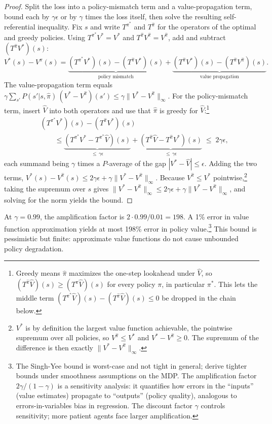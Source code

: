\begin{proof}
Split the loss into a policy-mismatch term and a value-propagation term, bound each by $\gamma\epsilon$ or by $\gamma$ times the loss itself, then solve the resulting self-referential inequality. Fix $s$ and write $T^{\pi^*}$ and $T^{\hat\pi}$ for the operators of the optimal and greedy policies. Using $T^{\pi^*} V^* = V^*$ and $T^{\hat\pi} V^{\hat\pi} = V^{\hat\pi}$, add and subtract $(T^{\hat\pi} V^*)(s)$:
\[
V^*(s) - V^{\hat\pi}(s) = \underbrace{(T^{\pi^*} V^*)(s) - (T^{\hat\pi} V^*)(s)}_{\text{policy mismatch}} + \underbrace{(T^{\hat\pi} V^*)(s) - (T^{\hat\pi} V^{\hat\pi})(s)}_{\text{value propagation}}.
\]
The value-propagation term equals $\gamma \sum_{s'} P(s'|s,\hat\pi)\,(V^* - V^{\hat\pi})(s') \leq \gamma \|V^* - V^{\hat\pi}\|_\infty$. For the policy-mismatch term, insert $\hat V$ into both operators and use that $\hat\pi$ is greedy for $\hat V$:\footnote{Greedy means $\hat\pi$ maximizes the one-step lookahead under $\hat V$, so $(T^{\hat\pi} \hat V)(s) \geq (T^{\pi} \hat V)(s)$ for every policy $\pi$, in particular $\pi^*$. This lets the middle term $(T^{\pi^*}\hat V)(s) - (T^{\hat\pi}\hat V)(s) \leq 0$ be dropped in the chain below.}
\begin{align*}
&(T^{\pi^*} V^*)(s) - (T^{\hat\pi} V^*)(s) \\
&\qquad \leq \underbrace{(T^{\pi^*} V^* - T^{\pi^*} \hat V)(s)}_{\leq\, \gamma\epsilon} + \underbrace{(T^{\hat\pi} \hat V - T^{\hat\pi} V^*)(s)}_{\leq\, \gamma\epsilon} \;\leq\; 2\gamma\epsilon,
\end{align*}
each summand being $\gamma$ times a $P$-average of the gap $|V^* - \hat V| \leq \epsilon$.
Adding the two terms, $V^*(s) - V^{\hat\pi}(s) \leq 2\gamma\epsilon + \gamma \|V^* - V^{\hat\pi}\|_\infty$. Because $V^{\hat\pi} \leq V^*$ pointwise,\footnote{$V^*$ is by definition the largest value function achievable, the pointwise supremum over all policies, so $V^{\hat\pi} \leq V^*$ and $V^* - V^{\hat\pi} \geq 0$. The supremum of the difference is then exactly $\|V^* - V^{\hat\pi}\|_\infty$.} taking the supremum over $s$ gives $\|V^* - V^{\hat\pi}\|_\infty \leq 2\gamma\epsilon + \gamma \|V^* - V^{\hat\pi}\|_\infty$, and solving for the norm yields the bound.
\end{proof}

At $\gamma = 0.99$, the amplification factor is $2 \cdot 0.99 / 0.01 = 198$. A 1\% error in value function approximation yields at most 198\% error in policy value.\footnote{The Singh-Yee bound is worst-case and not tight in general; \citet{farahmand2010} derive tighter bounds under smoothness assumptions on the MDP. The amplification factor $2\gamma/(1-\gamma)$ is a sensitivity analysis: it quantifies how errors in the ``inputs'' (value estimates) propagate to ``outputs'' (policy quality), analogous to errors-in-variables bias in regression. The discount factor $\gamma$ controls sensitivity; more patient agents face larger amplification.} This bound is pessimistic but finite: approximate value functions do not cause unbounded policy degradation.

